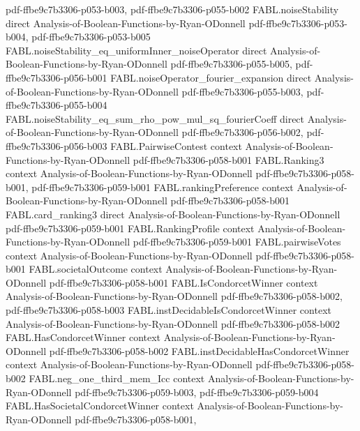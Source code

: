 \begin{theorem}
  {pdf-ffbe9c7b3306-p053-b003,
    pdf-ffbe9c7b3306-p055-b002}
\proofstep
  {FABL.noiseStability}
  {direct}
  {Analysis-of-Boolean-Functions-by-Ryan-ODonnell}
  {pdf-ffbe9c7b3306-p053-b004,
    pdf-ffbe9c7b3306-p053-b005}
\proofstep
  {FABL.noiseStability_eq_uniformInner_noiseOperator}
  {direct}
  {Analysis-of-Boolean-Functions-by-Ryan-ODonnell}
  {pdf-ffbe9c7b3306-p055-b005,
    pdf-ffbe9c7b3306-p056-b001}
\proofstep
  {FABL.noiseOperator_fourier_expansion}
  {direct}
  {Analysis-of-Boolean-Functions-by-Ryan-ODonnell}
  {pdf-ffbe9c7b3306-p055-b003,
    pdf-ffbe9c7b3306-p055-b004}
\proofstep
  {FABL.noiseStability_eq_sum_rho_pow_mul_sq_fourierCoeff}
  {direct}
  {Analysis-of-Boolean-Functions-by-Ryan-ODonnell}
  {pdf-ffbe9c7b3306-p056-b002,
    pdf-ffbe9c7b3306-p056-b003}
\proofstep
  {FABL.PairwiseContest}
  {context}
  {Analysis-of-Boolean-Functions-by-Ryan-ODonnell}
  {pdf-ffbe9c7b3306-p058-b001}
\proofstep
  {FABL.Ranking3}
  {context}
  {Analysis-of-Boolean-Functions-by-Ryan-ODonnell}
  {pdf-ffbe9c7b3306-p058-b001,
    pdf-ffbe9c7b3306-p059-b001}
\proofstep
  {FABL.rankingPreference}
  {context}
  {Analysis-of-Boolean-Functions-by-Ryan-ODonnell}
  {pdf-ffbe9c7b3306-p058-b001}
\proofstep
  {FABL.card_ranking3}
  {direct}
  {Analysis-of-Boolean-Functions-by-Ryan-ODonnell}
  {pdf-ffbe9c7b3306-p059-b001}
\proofstep
  {FABL.RankingProfile}
  {context}
  {Analysis-of-Boolean-Functions-by-Ryan-ODonnell}
  {pdf-ffbe9c7b3306-p059-b001}
\proofstep
  {FABL.pairwiseVotes}
  {context}
  {Analysis-of-Boolean-Functions-by-Ryan-ODonnell}
  {pdf-ffbe9c7b3306-p058-b001}
\proofstep
  {FABL.societalOutcome}
  {context}
  {Analysis-of-Boolean-Functions-by-Ryan-ODonnell}
  {pdf-ffbe9c7b3306-p058-b001}
\proofstep
  {FABL.IsCondorcetWinner}
  {context}
  {Analysis-of-Boolean-Functions-by-Ryan-ODonnell}
  {pdf-ffbe9c7b3306-p058-b002,
    pdf-ffbe9c7b3306-p058-b003}
\proofstep
  {FABL.instDecidableIsCondorcetWinner}
  {context}
  {Analysis-of-Boolean-Functions-by-Ryan-ODonnell}
  {pdf-ffbe9c7b3306-p058-b002}
\proofstep
  {FABL.HasCondorcetWinner}
  {context}
  {Analysis-of-Boolean-Functions-by-Ryan-ODonnell}
  {pdf-ffbe9c7b3306-p058-b002}
\proofstep
  {FABL.instDecidableHasCondorcetWinner}
  {context}
  {Analysis-of-Boolean-Functions-by-Ryan-ODonnell}
  {pdf-ffbe9c7b3306-p058-b002}
\proofstep
  {FABL.neg_one_third_mem_Icc}
  {context}
  {Analysis-of-Boolean-Functions-by-Ryan-ODonnell}
  {pdf-ffbe9c7b3306-p059-b003,
    pdf-ffbe9c7b3306-p059-b004}
\proofstep
  {FABL.HasSocietalCondorcetWinner}
  {context}
  {Analysis-of-Boolean-Functions-by-Ryan-ODonnell}
  {pdf-ffbe9c7b3306-p058-b001,
}
\end{theorem}
